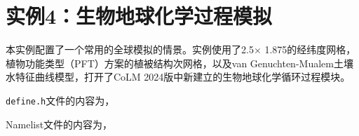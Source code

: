 \section{实例4：生物地球化学过程模拟}

本实例配置了一个常用的全球模拟的情景。实例使用了2.5\textdegree $\times$ 1.875\textdegree 的经纬度网格，植物功能类型（PFT）方案的植被结构次网格，以及van Genuchten-Mualem土壤水特征曲线模型，打开了CoLM 2024版中新建立的生物地球化学循环过程模块。

\texttt{define.h}文件的内容为，


Namelist文件的内容为，


